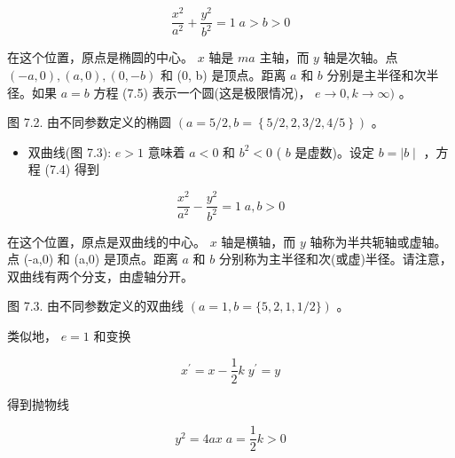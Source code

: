 \documentclass[../main.tex]{subfiles}
\begin{document}
\[
\frac{{x}^{2}}{{a}^{2}} + \frac{{y}^{2}}{{b}^{2}} = 1\;a > b > 0 \tag{7.5}
\]

在这个位置，原点是椭圆的中心。 \(x\) 轴是 \({ma}\) 主轴，而 \(y\) 轴是次轴。点 \(\left( {-a,0}\right) ,\left( {a,0}\right) ,\left( {0, - b}\right)\) 和 (0, b) 是顶点。距离 \(a\) 和 \(b\) 分别是主半径和次半径。如果 \(a = b\) 方程 (7.5) 表示一个圆(这是极限情况)， \(e \rightarrow  0,k \rightarrow  \infty )\) 。

\begin{center}
\begin{minipage}{18cm}
\vspace*{.6\baselineskip}
\centering
{}
\par\smallskip
图 7.2. 由不同参数定义的椭圆 \(\left( {a = 5/2,b = \left\{  {5/2,2,3/2,4/5}\right\}  }\right)\) 。
\end{minipage}
\end{center}

\begin{itemize}
\item 双曲线(图 7.3): \(e > 1\) 意味着 \(a < 0\) 和 \({b}^{2} < 0\) ( \(b\) 是虚数)。设定 \(b =  \mid  b \mid\) ，方程 (7.4) 得到
\end{itemize}

\[
\frac{{x}^{2}}{{a}^{2}} - \frac{{y}^{2}}{{b}^{2}} = 1\;a,b > 0 \tag{7.6}
\]





在这个位置，原点是双曲线的中心。 \(x\) 轴是横轴，而 \(y\) 轴称为半共轭轴或虚轴。点 (-a,0) 和 (a,0) 是顶点。距离 \(a\) 和 \(b\) 分别称为主半径和次(或虚)半径。请注意，双曲线有两个分支，由虚轴分开。

\begin{center}
\begin{minipage}{18cm}
\vspace*{.6\baselineskip}
\centering
{}
\par\smallskip
图 7.3. 由不同参数定义的双曲线 \(\left( {a = 1,b = \{ 5,2,1,1/2\} }\right)\) 。
\end{minipage}
\end{center}

类似地， \(e = 1\) 和变换

\[
{x}^{\prime } = x - \frac{1}{2}k\;{y}^{\prime } = y
\]

得到抛物线

\[
{y}^{2} = {4ax}\;a = \frac{1}{2}k > 0 \tag{7.7}
\]
\end{document}

